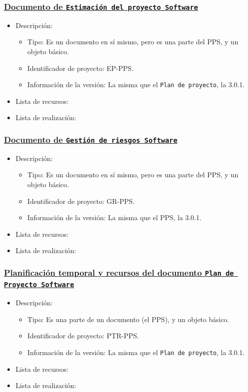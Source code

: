 \documentclass[spanish,a4paper,11pt, twoside]{report}	%
\begin{document}
			\subsubsection{\underline{Documento de \texttt{Estimación del proyecto Software}}}
			\begin{itemize}	
				\item{Descripción:}
					\begin{itemize}	
						\item{Tipo:} Es un documento en sí mismo, pero es una parte del PPS, y un objeto básico. 
						\item{Identificador de proyecto:} EP-PPS.
						\item{Información de la versión:} La misma que el \texttt{Plan de proyecto}, la 3.0.1.
					\end{itemize}	
				\item{Lista de recursos:}
				\item{Lista de realización:}
			\end{itemize}		
			
			\subsubsection{\underline{Documento de \texttt{Gestión de riesgos Software}}}
			\begin{itemize}	
				\item{Descripción:}
					\begin{itemize}	
						\item{Tipo:} Es un documento en sí mismo, pero es una parte del PPS, y un objeto básico.
						\item{Identificador de proyecto:} GR-PPS.
						\item{Información de la versión:} La misma que el PPS, la 3.0.1.
					\end{itemize}	
				\item{Lista de recursos:}
				\item{Lista de realización:}
			\end{itemize}		

			\subsubsection{\underline{Planificación temporal y recursos del documento \texttt{Plan de Proyecto Software}}}
			\begin{itemize}	
				\item{Descripción:}
					\begin{itemize}	
						\item{Tipo:} Es una parte de un documento (el PPS), y un objeto básico.
						\item{Identificador de proyecto:} PTR-PPS.
						\item{Información de la versión:} La misma que el \texttt{Plan de proyecto}, la 3.0.1.
					\end{itemize}	
				\item{Lista de recursos:}
				\item{Lista de realización:}
			\end{itemize}	
\end{document}
